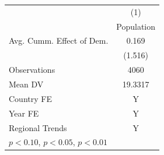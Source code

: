 \begin{tabular}{l*{1}{c}}
\hline
            &\multicolumn{1}{c}{(1)}\\
            &\multicolumn{1}{c}{Population}\\
\hline
Avg. Cumm. Effect of Dem.&       0.169         \\
            &     (1.516)         \\
\midrule
Observations&        4060         \\
Mean DV     &     19.3317         \\
Country FE  &           Y         \\
Year FE     &           Y         \\
Regional Trends&           Y         \\
\hline
\multicolumn{2}{l}{\footnotesize \sym{*} \(p<0.10\), \sym{**} \(p<0.05\), \sym{***} \(p<0.01\)}\\
\end{tabular}
